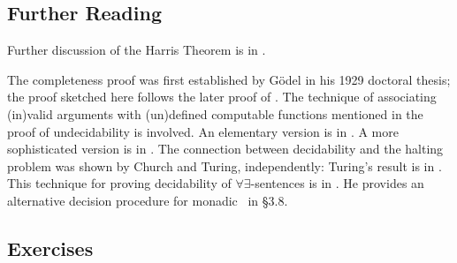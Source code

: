 {\small
\subsection*{Further Reading}

Further discussion of the Harris Theorem is in \citet{mcgtherue}.

The completeness proof was first established by G\"odel in his 1929 doctoral thesis; the proof sketched here follows the later proof of \citet{hencomfio}.  The technique of associating (in)valid arguments with (un)defined computable functions mentioned in the proof of undecidability is involved. An elementary version is in \citet[ch. 7--8]{jefforlos}. A more sophisticated version is in \citet[ch. 1--8]{bbjcomlo}. The connection between decidability and the halting problem was shown by Church and Turing, independently: Turing's result is in \citet{turoncon}.  This technique for proving decidability of $\forall\exists$-sentences is in \citet[\S 3.9]{bosintlo}. He provides an alternative decision procedure for monadic \ltwo\ in \S 3.8.



\subsection*{Exercises}

}
